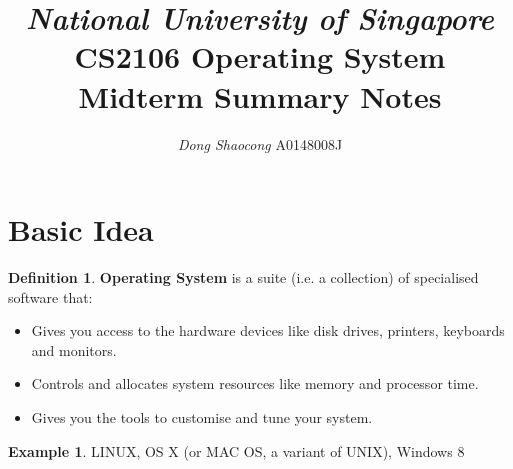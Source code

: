 \documentclass[12pt,a4paper]{article}
\title{\textsl{National University of Singapore} \\ \textbf{CS2106 Operating System}\\ Midterm Summary Notes}
\author{\textit{Dong Shaocong} A0148008J}
\theoremstyle{definition}
\newtheorem{definition}{Definition}[section]
\newtheorem{example}{Example}[section]
\newenvironment{myitemize}
{ \begin{itemize}
    \setlength{\itemsep}{5pt}
    \setlength{\parskip}{0pt}
    \setlength{\parsep}{0pt}     }
{ \end{itemize}                  }
\begin{document}
\maketitle

\tableofcontents

\newpage
\section{Basic Idea}
\begin{definition}{\textbf{Operating System}}
	is a suite (i.e. a collection) of specialised software that:
	\begin{myitemize}
		\item Gives you access to the hardware devices like disk drives, printers, keyboards and monitors.
		\item Controls and allocates system resources like memory and processor time.
		\item Gives you the tools to customise and tune your system.
	\end{myitemize}
\end{definition}
\begin{example}
	LINUX, OS X (or MAC OS, a variant of UNIX), Windows 8
\end{example}
\end{document}
